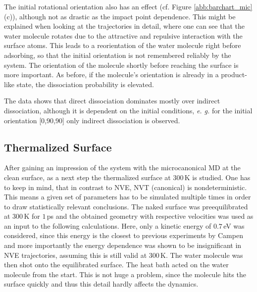 \documentclass[11pt,DIV=13,BCOR=5mm,a4paper,headinclude]{scrbook}
\begin{document}
The initial rotational orientation also has an effect (cf. Figure \ref{abb:barchart_mic}(c)), although not as drastic as the impact point dependence.
This might be explained when looking at the trajectories in detail, where one can see that the water molecule rotates due to the attractive and repulsive interaction with the surface atoms.
This leads to a reorientation of the water molecule right before adsorbing, so that the initial orientation is not remembered reliably by the system.
The orientation of the molecule shortly before reaching the surface is more important.
As before, if the molecule's orientation is already in a product-like state, the dissociation probability is elevated.


The data shows that direct dissociation dominates mostly over indirect dissociation, although it is dependent on the initial conditions, \textit{e.
g.} for the initial orientation [0,90,90] only indirect dissociation is observed.

 
\subsection{Thermalized Surface}\label{therm_surf}
After gaining an impression of the system with the microcanonical MD at the clean surface, as a next step the thermalized surface at $300\,$K is studied.
One has to keep in mind, that in contrast to NVE, NVT (canonical) is nondeterministic.
This means a given set of parameters has to be simulated multiple times in order to draw statistically relevant conclusions.
The naked surface was preequilibrated at $300\,$K for $1\,$ps and the obtained geometry with respective velocities was used as an input to the following calculations.
Here, only a kinetic energy of $0.7\,$eV was considered, since this energy is the closest to previous experiments by Campen and more importantly the energy dependence was shown to be insignificant in NVE trajectories, assuming this is still valid at $300\,$K.
The water molecule was then shot onto the equilibrated surface.
The heat bath acted on the water molecule from the start.
This is not huge a problem, since the molecule hits the surface quickly and thus this detail hardly affects the dynamics.
\end{document}
